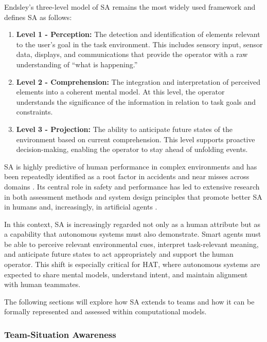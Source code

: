 \documentclass[12pt,a4paper]{article} %
\begin{document}
	Endsley's three-level model of SA \parencite{endsley_measurement_1995} remains the most widely used framework and defines SA as follows:
	\begin{enumerate}
		\item \textbf{Level 1 - Perception:} The detection and identification of elements relevant to the user's goal in the task environment. This includes sensory input, sensor data, displays, and communications that provide the operator with a raw understanding of “what is happening.”
		
		\item \textbf{Level 2 - Comprehension:} The integration and interpretation of perceived elements into a coherent mental model. At this level, the operator understands the significance of the information in relation to task goals and constraints.
		
		\item \textbf{Level 3 - Projection:} The ability to anticipate future states of the environment based on current comprehension. This level supports proactive decision-making, enabling the operator to stay ahead of unfolding events.
	\end{enumerate}

	SA is highly predictive of human performance in complex environments and has been repeatedly identified as a root factor in accidents and near misses across domains \parencite{endsley_systematic_2021}. Its central role in safety and performance has led to extensive research in both assessment methods and system design principles that promote better SA in humans and, increasingly, in artificial agents \parencite{kokar_situation_2012}.

	In this context, SA is increasingly regarded not only as a human attribute but as a capability that autonomous systems must also demonstrate. Smart agents must be able to perceive relevant environmental cues, interpret task-relevant meaning, and anticipate future states to act appropriately and support the human operator. This shift is especially critical for HAT, where autonomous systems are expected to share mental models, understand intent, and maintain alignment with human teammates.

	The following sections will explore how SA extends to teams and how it can be formally represented and assessed within computational models.

	\subsubsection{Team-Situation Awareness}
\end{document}
